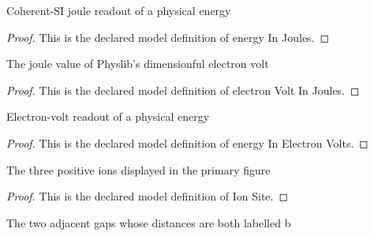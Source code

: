 \begin{definition}
  \label{def:physics:phyx-mini-0658:phyxminiproblems-problemphyxmini0658-energyinjoules}
  Coherent-SI joule readout of a physical energy
\end{definition}
\begin{proof}
  This is the declared model definition of energy In Joules.
\end{proof}
\begin{definition}
  \label{def:physics:phyx-mini-0658:phyxminiproblems-problemphyxmini0658-electronvoltinjoules}
  The joule value of Physlib's dimensionful electron volt
\end{definition}
\begin{proof}
  This is the declared model definition of electron Volt In Joules.
\end{proof}
\begin{definition}
  \label{def:physics:phyx-mini-0658:phyxminiproblems-problemphyxmini0658-energyinelectronvolts}
  Electron-volt readout of a physical energy
\end{definition}
\begin{proof}
  This is the declared model definition of energy In Electron Volts.
\end{proof}
\begin{definition}
  \label{def:physics:phyx-mini-0658:phyxminiproblems-problemphyxmini0658-ionsite}
  The three positive ions displayed in the primary figure
\end{definition}
\begin{proof}
  This is the declared model definition of Ion Site.
\end{proof}
\begin{definition}
  \label{def:physics:phyx-mini-0658:phyxminiproblems-problemphyxmini0658-adjacentgap}
  The two adjacent gaps whose distances are both labelled b
\end{definition}
